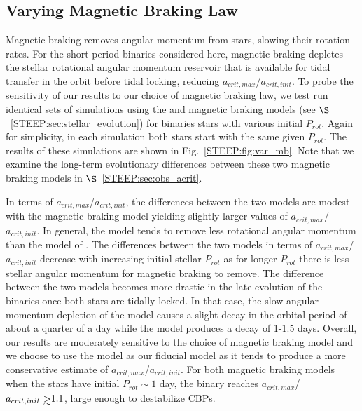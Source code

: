 \subsection{Varying Magnetic Braking Law} \label{STEEP:sec:var_mb}

Magnetic braking removes angular momentum from stars, slowing their rotation rates.  For the short-period binaries considered here, magnetic braking depletes the stellar rotational angular momentum reservoir that is available for tidal transfer in the orbit before tidal locking, reducing $a_{crit,max}$/$a_{crit,init}$.  To probe the sensitivity of our results to our choice of magnetic braking law, we test run identical sets of simulations using the \citet{Reiners2012} and \citet{Repetto2014} magnetic braking models (see $\S$~\ref{STEEP:sec:stellar_evolution}) for binaries stars with various initial $P_{rot}$.  Again for simplicity, in each simulation both stars start with the same given $P_{rot}$.  The results of these simulations are shown in Fig.~\ref{STEEP:fig:var_mb}.  Note that we examine the long-term evolutionary differences between these two magnetic braking models in $\S$~\ref{STEEP:sec:obs_acrit}.

In terms of $a_{crit,max}$/$a_{crit,init}$, the differences between the two models are modest with the \citet{Repetto2014} magnetic braking model yielding slightly larger values of $a_{crit,max}$/$a_{crit,init}$.  In general, the \citet{Repetto2014} model tends to remove less rotational angular momentum than the model of \citet{Reiners2012}.  The differences between the two models in terms of $a_{crit,max}$/$a_{crit,init}$ decrease with increasing initial stellar $P_{rot}$ as for longer $P_{rot}$ there is less stellar angular momentum for magnetic braking to remove.  The difference between the two models becomes more drastic in the late evolution of the binaries once both stars are tidally locked.  In that case, the slow angular momentum depletion of the \citet{Repetto2014} model causes a slight decay in the orbital period of about a quarter of a day while the \citet{Reiners2012} model produces a decay of 1-1.5 days.  Overall, our results are moderately sensitive to the choice of magnetic braking model and we choose to use the \citet{Reiners2012} model as our fiducial model as it tends to produce a more conservative estimate of $a_{crit,max}$/$a_{crit,init}$.  For both magnetic braking models when the stars have initial $P_{rot} \sim 1$ day, the binary reaches $a_{crit,max}$/$a_{crit,init} \gsim 1.1$, large enough to destabilize CBPs.  


